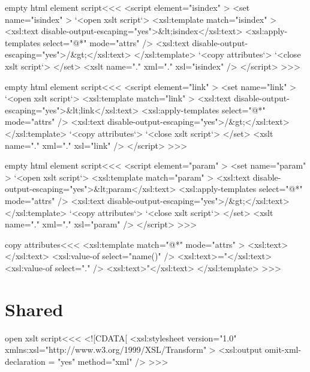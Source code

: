 \documentclass{article}
\begin{document}
{{{ \<empty html element script\><<< 
<script element="isindex" > 
   <set name="isindex" > 
      `<open xslt script`> 
      <xsl:template match="isindex" > 
         <xsl:text disable-output-escaping="yes">&lt;isindex</xsl:text> 
             <xsl:apply-templates select="@*" mode="attrs" /> 
         <xsl:text disable-output-escaping="yes">/&gt;</xsl:text> 
      </xsl:template>  
      `<copy attributes`> 
      `<close xslt script`> 
   </set> 
   <xslt name="." xml="." xsl="isindex" /> 
</script>  
>>> 




 \<empty html element script\><<< 
<script element="link" > 
   <set name="link" > 
      `<open xslt script`> 
      <xsl:template match="link" > 
         <xsl:text disable-output-escaping="yes">&lt;link</xsl:text> 
             <xsl:apply-templates select="@*" mode="attrs" /> 
         <xsl:text disable-output-escaping="yes">/&gt;</xsl:text> 
      </xsl:template>  
      `<copy attributes`> 
      `<close xslt script`> 
   </set> 
   <xslt name="." xml="." xsl="link" /> 
</script>  
>>> 




 \<empty html element script\><<< 
<script element="param" > 
   <set name="param" > 
      `<open xslt script`> 
      <xsl:template match="param" > 
         <xsl:text disable-output-escaping="yes">&lt;param</xsl:text> 
             <xsl:apply-templates select="@*" mode="attrs" /> 
         <xsl:text disable-output-escaping="yes">/&gt;</xsl:text> 
      </xsl:template>  
      `<copy attributes`> 
      `<close xslt script`> 
   </set> 
   <xslt name="." xml="." xsl="param" /> 
</script>  
>>> 










\<copy attributes\><<<
<xsl:template match="@*" mode="attrs" >
   <xsl:text> </xsl:text>
   <xsl:value-of select="name()" />
   <xsl:text>="</xsl:text>
   <xsl:value-of select="." />
   <xsl:text>"</xsl:text>
</xsl:template>
>>>




\section{Shared}



\<open xslt script\><<<
<![CDATA[ 
   <xsl:stylesheet version="1.0"
      xmlns:xsl="http://www.w3.org/1999/XSL/Transform"
   >
      <xsl:output omit-xml-declaration = "yes" method="xml" />
>>>

}}}
\end{document}
